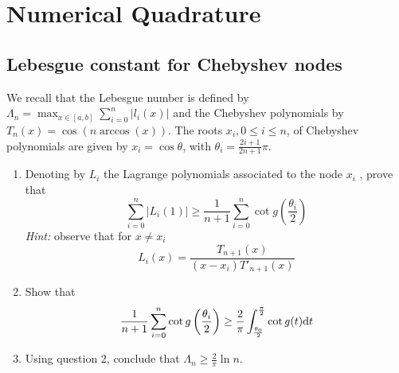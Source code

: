 \renewcommand{\chaptername}{Assignment}
\chapter{Numerical Quadrature}

\section{Lebesgue constant for Chebyshev nodes}
We recall that the Lebesgue number is defined by \(\Lambda_n=\max_{x\in[a,b]}\sum_{i=0}^{n}|l_i(x)|\) and the Chebyshev polynomials by \(T_n(x)=\cos(n\arccos(x))\).
The roots \(x_i,0\leq i\leq n\), of Chebyshev polynomials are given by \(x_i=\cos\theta\), with \(\theta_i=\frac{2i+1}{2n+1}\pi\).
\begin{enumerate}
	\item Denoting by $L_i$ the Lagrange polynomials associated to the node $x_i$ , prove that
	\[ \sum_{i=0}^n|L_i(1)|\geq\frac{1}{n+1}\sum_{i=0}^n\cot g\left(\frac{\theta_i}{2}\right) \]
	\textit{Hint:} observe that for \(x\neq x_i\)
	\[ L_i(x)=\frac{T_{n+1}(x)}{(x-x_i)T'_{n+1}(x)} \]
	\item Show that
	\[ \frac{1}{n+1}\sum_{i=0}^n\cot g\left(\frac{\theta_i}{2}\right)\geq\frac{2}{\pi}\int_{\frac{\theta_0}{2}}^{\frac{\pi}{2}}\cot g(t)\mathrm{d} t \]
	\item Using question 2, conclude that \(\Lambda_n\geq\frac{2}{\pi}\ln n\).
\end{enumerate}

